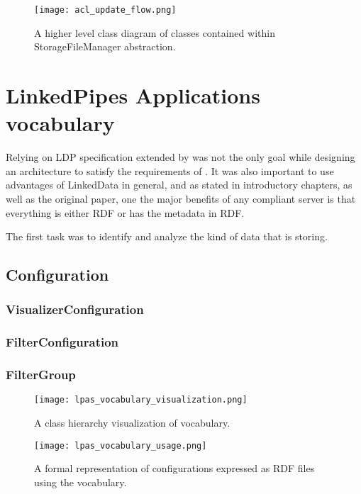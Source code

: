 \begin{figure}[h]
\centering
\texttt{[image: acl\_update\_flow.png]}
\caption{A higher level class diagram of classes contained within StorageFileManager abstraction.}
\label{fig:lps_acl_update_flow}
\end{figure}


\section{LinkedPipes Applications vocabulary}

Relying on LDP specification extended by \solid{} was not the only goal while designing an architecture to satisfy the requirements of \lpa{}. It was also important to use advantages of LinkedData in general, and as stated in introductory chapters, as well as the original paper, one the major benefits of any \solid{} compliant server is that everything is either RDF or has the metadata in RDF.  

The first task was to identify and analyze the kind of data that \lpa{} is storing. 

\subsection{Configuration}
\subsubsection{VisualizerConfiguration}
\subsubsection{FilterConfiguration}
\subsubsection{FilterGroup}

\begin{figure}[h]
\centering
\texttt{[image: lpas\_vocabulary\_visualization.png]}
\caption{A class hierarchy visualization of \lpa{} vocabulary.}
\label{fig:lpas_vocabulary_visualization}
\end{figure}


\begin{figure}[h]
\centering
\texttt{[image: lpas\_vocabulary\_usage.png]}
\caption{A formal representation of \lpa{} configurations expressed as RDF files using the \lpas{} vocabulary.}
\label{fig:lpas_vocabulary_usage}
\end{figure}


